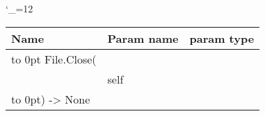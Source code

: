 \begingroup \catcode`\_=12 \tt
\begin{tabular}{lll}
\toprule
\textrm{Name}&\textrm{Param name}&\textrm{param type}\\
\midrule
\hbox to 0pt {File.Close(\hss}\\
& self\\
\hbox to 0pt{) -> None\hss}\\
\bottomrule
\end{tabular}
\endgroup
